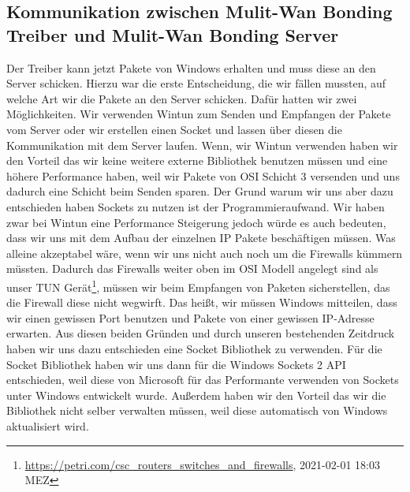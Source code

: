 \subsection{Kommunikation zwischen Mulit-Wan Bonding Treiber und Mulit-Wan Bonding Server}
Der Treiber kann jetzt Pakete von Windows erhalten und muss diese an den Server schicken. Hierzu war die erste Entscheidung, die wir fällen mussten, auf welche Art wir die Pakete an den Server schicken. Dafür hatten wir zwei Möglichkeiten. Wir verwenden Wintun zum Senden und Empfangen der Pakete vom Server oder wir erstellen einen Socket und lassen über diesen die Kommunikation mit dem Server laufen.
\newline
\newline
Wenn, wir Wintun verwenden haben wir den Vorteil das wir keine weitere externe Bibliothek benutzen müssen und eine höhere Performance haben, weil wir Pakete von OSI Schicht 3 versenden und uns dadurch eine Schicht beim Senden sparen.
\newline
\newline
Der Grund warum wir uns aber dazu entschieden haben Sockets zu nutzen ist der Programmieraufwand. Wir haben zwar bei Wintun eine Performance Steigerung jedoch würde es auch bedeuten, dass wir uns mit dem Aufbau der einzelnen IP Pakete beschäftigen müssen. Was alleine akzeptabel wäre, wenn wir uns nicht auch noch um die Firewalls kümmern müssten. Dadurch das Firewalls weiter oben im OSI Modell angelegt sind als unser TUN Gerät\footnote[1]{\url{https://petri.com/csc_routers_switches_and_firewalls}, 2021-02-01 18:03 MEZ}, müssen wir beim Empfangen von Paketen sicherstellen, das die Firewall diese nicht wegwirft. Das heißt, wir müssen Windows mitteilen, dass wir einen gewissen Port benutzen und Pakete von einer gewissen IP-Adresse erwarten. Aus diesen beiden Gründen und durch unseren bestehenden Zeitdruck haben wir uns dazu entschieden eine Socket Bibliothek zu verwenden.
\newline
\newline
Für die Socket Bibliothek haben wir uns dann für die Windows Sockets 2 API entschieden, weil diese von Microsoft für das Performante verwenden von Sockets unter Windows entwickelt wurde. Außerdem haben wir den Vorteil das wir die Bibliothek nicht selber verwalten müssen, weil diese automatisch von Windows aktualisiert wird.


